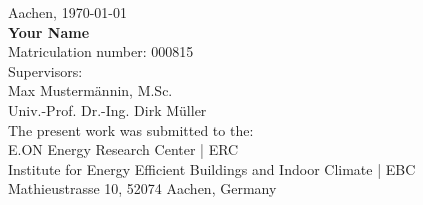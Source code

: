 \begin{titlepage}
\begin{addmargin}[\marginCoverPage]{0cm}
\vfill
\begin{center}
\begingroup
{}\selectfont
Aachen, \monthyeardate\today \\
\addvspace{0.5cm}
\textbf{Your Name} \\
Matriculation number: 000815 \\
\addvspace{0.5cm}
Supervisors:\\
Max Mustermännin, M.Sc. \\
Univ.-Prof. Dr.-Ing. Dirk Müller \\
\addvspace{0.5cm}
The present work was submitted to the:\\
E.ON Energy Research Center | ERC \\
Institute for Energy Efficient Buildings and Indoor Climate | EBC\\
Mathieustrasse 10, 52074 Aachen, Germany\\
\endgroup
\end{center}
\end{addmargin}
\end{titlepage}


